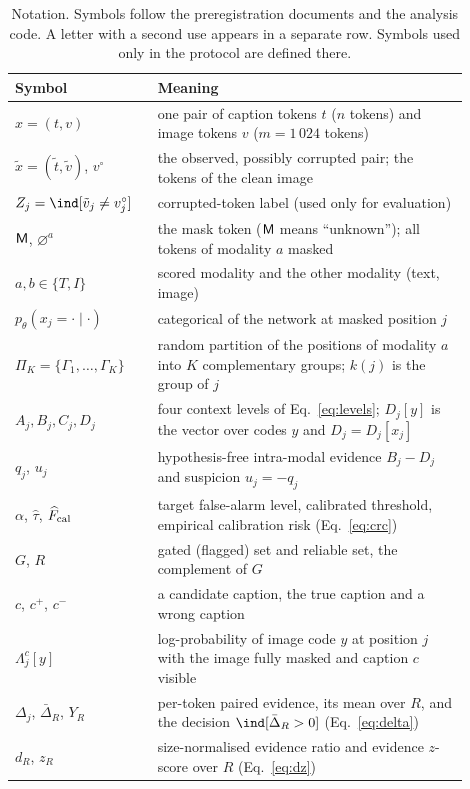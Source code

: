 \begin{table}[t]
\centering
\caption{Notation. Symbols follow the preregistration documents and the analysis code. A letter with a second use appears in a
separate row. Symbols used only in the protocol are defined there.}
\label{tab:notation}
\footnotesize
\begin{tabular}{p{0.27\linewidth}p{0.63\linewidth}}
\toprule
Symbol & Meaning \\
\midrule
$x=(t,v)$ & one pair of caption tokens $t$ ($n$ tokens) and image tokens $v$ ($m=1\,024$ tokens) \\
$\tilde x=(\tilde t,\tilde v)$, $v^\circ$ & the observed, possibly corrupted pair; the tokens of the clean image \\
$Z_j=\ind[\tilde v_j\neq v^\circ_j]$ & corrupted-token label (used only for evaluation) \\
$\mathsf{M}$, $\varnothing^a$ & the mask token ($\mathsf{M}$ means ``unknown''); all tokens of modality $a$ masked \\
$a,b\in\{T,I\}$ & scored modality and the other modality (text, image) \\
$p_\theta(x_j=\cdot\mid\cdot)$ & categorical of the network at masked position $j$ \\
$\Pi_K=\{\Gamma_1,\dots,\Gamma_K\}$ & random partition of the positions of modality $a$ into $K$ complementary groups; $k(j)$ is the group of $j$ \\
$A_j,B_j,C_j,D_j$ & four context levels of Eq.~\eqref{eq:levels}; $D_j[y]$ is the vector over codes $y$ and $D_j=D_j[x_j]$ \\
$q_j$, $u_j$ & hypothesis-free intra-modal evidence $B_j-D_j$ and suspicion $u_j=-q_j$ \\
$\alpha$, $\hat\tau$, $\widehat F_{\rm cal}$ & target false-alarm level, calibrated threshold, empirical calibration risk (Eq.~\ref{eq:crc}) \\
$G$, $R$ & gated (flagged) set and reliable set, the complement of $G$ \\
$c$, $c^+$, $c^-$ & a candidate caption, the true caption and a wrong caption \\
$\Lambda^c_j[y]$ & log-probability of image code $y$ at position $j$ with the image fully masked and caption $c$ visible \\
$\Delta_j$, $\bar\Delta_R$, $Y_R$ & per-token paired evidence, its mean over $R$, and the decision $\ind[\bar\Delta_R>0]$ (Eq.~\ref{eq:delta}) \\
$d_R$, $z_R$ & size-normalised evidence ratio and evidence $z$-score over $R$ (Eq.~\ref{eq:dz}) \\

\end{tabular}
\end{table}
